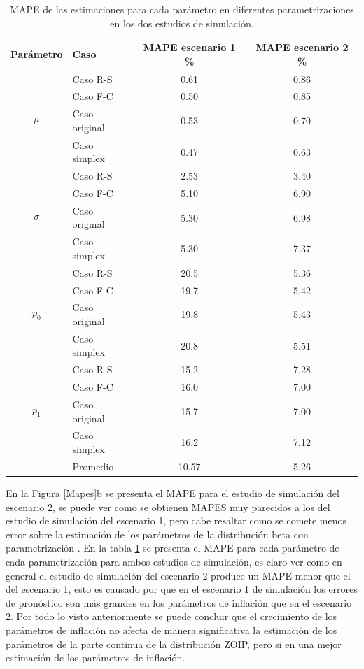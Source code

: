 \begin{table}[!hbt]
{\scriptsize
\begin{center}
\begin{tabular}{|c|l|cc|}\hline
 Par\'{a}metro & Caso & MAPE escenario 1 \% &  MAPE escenario 2 \% \\ \hline

\multirow{4}{*}{$\mu$}&Caso R-S &0.61 & 0.86	\\
& Caso F-C & 0.50	& 0.85	\\
& Caso original &0.53 & 0.70	 \\
& Caso simplex 	&0.47 & 0.63	\\ \hline

\multirow{4}{*}{$\sigma$} &Caso R-S &2.53 & 3.40\\
& Caso F-C 	&5.10 & 6.90\\
& Caso original &5.30 & 6.98\\
& Caso simplex 	&5.30  &7.37 \\\hline

\multirow{4}{*}{$p_0$} &Caso R-S &20.5  & 5.36	\\
& Caso F-C &19.7  & 5.42	\\
& Caso original &19.8 & 5.43	\\
& Caso simplex 	&20.8 & 5.51\\ \hline

\multirow{4}{*}{$p_1$} &Caso R-S 	&15.2 & 7.28\\
& Caso F-C &16.0 & 7.00  \\
& Caso original &15.7	 & 7.00	\\
& Caso simplex &16.2 & 7.12	 \\ \hline
& Promedio & 10.57 & 5.26 \\ \hline
\end{tabular}
\caption{MAPE de las estimaciones para cada par\'{a}metro en diferentes parametrizaciones en los dos estudios de simulaci\'{o}n.}
\label{T_MAPES}
\end{center}
}
\end{table}

En la Figura \ref{Mapes}b se presenta el MAPE para el estudio de simulaci\'{o}n del escenario 2, se puede ver como se obtienen MAPES muy parecidos a los del estudio de simulaci\'{o}n del escenario 1, pero cabe resaltar como se comete menos error sobre la estimaci\'{o}n de los par\'{a}metros de la distribuci\'{o}n beta con parametrizaci\'{o}n \cite{Stasinopoulos2}. En la tabla \ref{T_MAPES} se presenta el MAPE para cada par\'{a}metro de cada parametrizaci\'{o}n para ambos estudios de simulaci\'{o}n, es claro ver como en general el estudio de simulaci\'{o}n del escenario 2 produce un MAPE menor que el del escenario 1, esto es causado por que en el escenario 1 de simulaci\'{o}n los errores de pron\'{o}stico son m\'{a}s grandes en los par\'{a}metros de inflaci\'{o}n que en el escenario 2. Por todo lo visto anteriormente se puede concluir que el crecimiento de los par\'{a}metros de inflaci\'{o}n no afecta de manera significativa la estimaci\'{o}n de los par\'{a}metros de la parte continua de la distribuci\'{o}n ZOIP, pero si en una mejor estimaci\'{o}n de los par\'{a}metros de inflaci\'{o}n.


